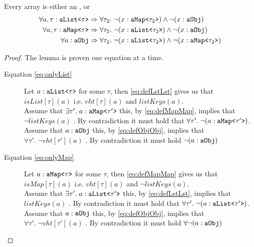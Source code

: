 \begin{lemma} Every array is either an \pamap, \palst{} or \paobj 
\begin{align}
\forall a,\tau : \palst &\Rightarrow \forall \tau_2. \; \neg (x :\pamap[\tau_2]) \wedge \neg (x: \paobj)\label{eq:onlyList}\\
\forall a,\tau : \pamap &\Rightarrow \forall \tau_2. \; \neg (x :\palst[\tau_2]) \wedge \neg (x: \paobj)\label{eq:onlyMap}\\
\forall a : \paobj &\Rightarrow \forall \tau_2. \; \neg (x :\palst[\tau_2]) \wedge \neg (x : \pamap[\tau_2])\label{eq:onlyObj}
\end{align}
\end{lemma}
\begin{proof}
The lemma is proven one equation at a time. 

\begin{description}
\item[Equation \ref{eq:onlyList}] 
\begin{subproof}
Let $a : \palst$ for some $\tau$, then \ref{eq:defLstLst} gives us that $isList[\tau](a)$ i.e. $vht[\tau](a)$ and $listKeys(a)$. \\
Assume that $\exists \tau'.\;a : \pamap[\tau']$ this, by \ref{eq:defMapMap}, implies that $\neg listKeys(a)$ \lightning. By contradiction it must hold that $\forall \tau'.\; \neg(a : \pamap[\tau'])$.\\
Assume that $a : \paobj$ this, by \ref{eq:defObjObj}, implies that $\forall \tau'.\; \neg vht[\tau'](a)$ \lightning. By contradiction it must hold $\neg (a : \paobj)$
\end{subproof}

\item[Equation \ref{eq:onlyMap}]
\begin{subproof}
Let $a : \pamap$ for some $\tau$, then \ref{eq:defMapMap} gives us that $isMap[\tau](a)$ i.e. $vht[\tau](a)$ and $\neg listKeys(a)$. \\
Assume that $\exists \tau'.\;a : \palst[\tau']$ this, by \ref{eq:defLstLst}, implies that $listKeys(a)$ \lightning. By contradiction it must hold that $\forall \tau'.\; \neg(a : \palst[\tau'])$.\\
Assume that $a : \paobj$ this, by \ref{eq:defObjObj}, implies that $\forall \tau'.\; \neg vht[\tau'](a)$ \lightning. By contradiction it must hold $\forall \neg (a : \paobj)$
\end{subproof}


\end{description}
\end{proof}
